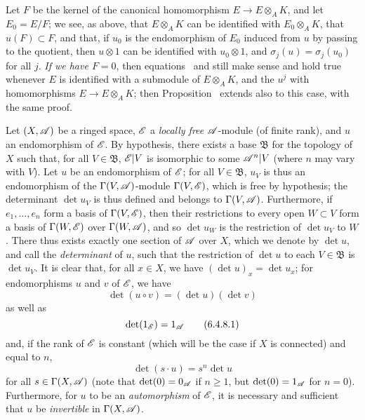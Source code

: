 \begin{remark}[6.4.7]
Let $F$ be the kernel of the canonical homomorphism $E\to E\otimes_A K$, and let $E_0=E/F$;
we see, as above, that $E\otimes_A K$ can be identified with $E_0\otimes_A K$, that $u(F)\subset F$, and that, if $u_0$ is the endomorphism of $E_0$ induced from $u$ by passing to the quotient, then $u\otimes1$ can be identified with $u_0\otimes1$, and $\sigma_j(u)=\sigma_j(u_0)$ for all $j$.
\emph{If we have $F=0$}, then equations~ and  still make sense and hold true whenever $E$ is identified with a submodule of $E\otimes_A K$, and the $u^j$ with homomorphisms $E\to E\otimes_A K$;
then Proposition~ extends also to this case, with the same proof.
\end{remark}

\begin{env}[6.4.8]
\label{II.6.4.8}
Let $(X,\mathscr{A})$ be a ringed space, $\mathscr{E}$ a \emph{locally free} $\mathscr{A}$-module (of finite rank), and $u$ an endomorphism of $\mathscr{E}$.
By hypothesis, there exists a base $\mathfrak{B}$ for the topology of $X$ such that, for all $V\in\mathfrak{B}$, $\mathscr{E}|V$ is isomorphic to some $\mathscr{A}^n|V$ (where $n$ may vary with $V$).
Let $u$ be an endomorphism of $\mathscr{E}$;
for all $V\in\mathfrak{B}$, $u_V$ is thus an endomorphism of the $\Gamma(V,\mathscr{A})$-module $\Gamma(V,\mathscr{E})$, which is free by hypothesis;
the determinant $\det u_V$ is thus defined and belongs to $\Gamma(V,\mathscr{A})$.
Furthermore, if $e_1,\ldots,e_n$ form a basis of $\Gamma(V,\mathscr{E})$, then their restrictions to every open $W\subset V$ form a basis of $\Gamma(W,\mathscr{E})$ over $\Gamma(W,\mathscr{A})$, and so $\det u_W$ is the restriction of $\det u_V$ to $W$.
There thus exists exactly one section of $\mathscr{A}$ over $X$, which we denote by $\det u$, and call the \emph{determinant} of $u$, such that the restriction of $\det u$ to each $V\in\mathfrak{B}$ is $\det u_V$.
It is clear that, for all $x\in X$, we have $(\det u)_x=\det u_x$;
for endomorphisms $u$ and $v$ of $\mathscr{E}$, we have
\[
\label{II.6.4.8.1}
  \det(u\circ v) = (\det u)(\det v)
\tag{6.4.8.1}
\]
as well as
\[
\label{II.6.4.8.1}
  \det(1_{\mathscr{E}}) = 1_{\mathscr{A}}
\tag{6.4.8.1}
\]
and, if the rank of $\mathscr{E}$ is constant (which will be the case  if $X$ is connected) and equal to $n$,
\[
\label{II.6.4.8.3}
  \det(s\cdot u) = s^n\det u
\tag{6.4.8.3}
\]
for all $s\in\Gamma(X,\mathscr{A})$ (note that $\det(0)=0_{\mathscr{A}}$ if $n\geq1$, but $\det(0)=1_{\mathscr{A}}$ for $n=0$).
Furthermore, for $u$ to be an \emph{automorphism} of $\mathscr{E}$, it is necessary and sufficient that $u$ be \emph{invertible} in $\Gamma(X,\mathscr{A})$.


\end{env}
